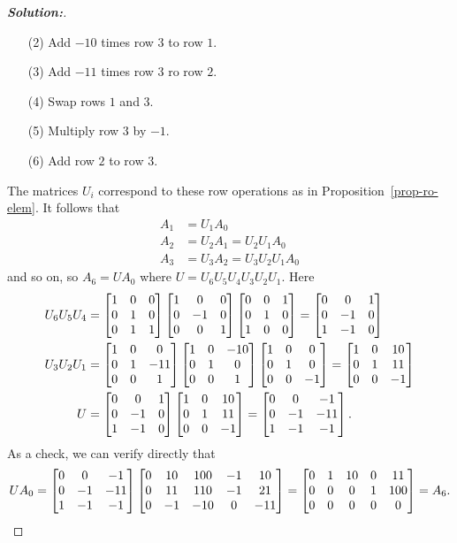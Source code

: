 \documentclass[a4paper]{amsart}
\theoremstyle{definition}
\newenvironment{solution}{\begin{proof}[\textbf{Solution:}] \vphantom{u}}{\end{proof}}
\begin{document}
\begin{solution}
\begin{itemize}
  \item[(2)] Add $-10$ times row $3$ to row $1$.
  \item[(3)] Add $-11$ times row $3$ ro row $2$.
  \item[(4)] Swap rows $1$ and $3$.
  \item[(5)] Multiply row $3$ by $-1$.
  \item[(6)] Add row $2$ to row $3$.
 \end{itemize}
 The matrices $U_i$ correspond to these row operations as in
 Proposition~\ref{prop-ro-elem}.  It follows that
 \begin{align*}
  A_1 &= U_1A_0 \\
  A_2 &= U_2A_1 = U_2U_1A_0 \\
  A_3 &= U_3A_2 = U_3U_2U_1A_0
 \end{align*}
 and so on, so $A_6=UA_0$ where $U=U_6U_5U_4U_3U_2U_1$.
 Here 
 \begin{align*}
  U_6U_5U_4 &= \left[\begin{matrix} 1&0&0 \\ 0&1&0 \\ 0&1&1 \end{matrix}\right]
               \left[\begin{matrix} 1&0&0 \\ 0&-1&0 \\ 0&0&1 \end{matrix}\right]
               \left[\begin{matrix} 0&0&1 \\ 0&1&0 \\ 1&0&0 \end{matrix}\right]
             = \left[\begin{matrix} 0&0&1 \\ 0&-1&0 \\1&-1&0 \end{matrix}\right] \\
  U_3U_2U_1 &= \left[\begin{matrix} 1&0&0 \\ 0&1&-11 \\ 0&0&1 \end{matrix}\right]
               \left[\begin{matrix} 1&0&-10 \\ 0&1&0 \\ 0&0&1 \end{matrix}\right]
               \left[\begin{matrix} 1&0&0 \\ 0&1&0 \\ 0&0&-1 \end{matrix}\right]
             = \left[\begin{matrix} 1&0&10 \\ 0&1&11 \\ 0&0&-1 \end{matrix}\right] \\
  U         &= \left[\begin{matrix} 0&0&1 \\ 0&-1&0 \\1&-1&0 \end{matrix}\right]
               \left[\begin{matrix} 1&0&10 \\ 0&1&11 \\ 0&0&-1 \end{matrix}\right] 
             = \left[\begin{matrix} 0&0&-1 \\ 0&-1&-11 \\ 1&-1&-1 \end{matrix}\right].
 \end{align*}
 As a check, we can verify directly that
 \[ UA_0 = 
    \left[\begin{matrix} 0&0&-1 \\ 0&-1&-11 \\ 1&-1&-1 \end{matrix}\right]
    \left[\begin{matrix} 0 & 10 & 100 & -1 &  10 \\
         0 & 11 & 110 & -1 &  21 \\
         0 & -1 & -10 &  0 & -11
    \end{matrix}\right] = 
    \left[\begin{matrix} 0 &  1 &  10 &  0 &   11 \\
         0 &  0 &   0 &  1 &  100 \\
         0 &  0 &   0 &  0 &    0
    \end{matrix}\right] =
    A_6.
 \]
\end{solution}
\end{document}

